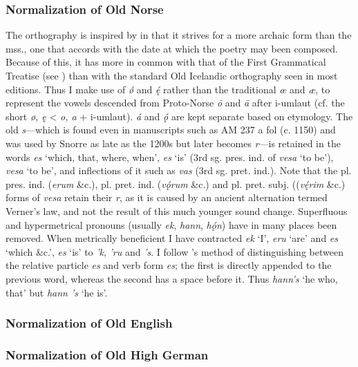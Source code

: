     \subsubsection{Normalization of Old Norse}
    The orthography is inspired by \textcite{FinnurEdda} in that it strives for a more archaic form than the mss., one that accords with the date at which the poetry may been composed. Because of this, it has more in common with that of the First Grammatical Treatise (see \parencite{FGTHaugen}) than with the standard Old Icelandic orthography seen in most editions. Thus I make use of \emph{ǿ} and \emph{ę́} rather than the traditional \emph{œ} and \emph{æ}, to represent the vowels descended from Proto-Norse \emph{ō} and \emph{ā} after i-umlaut (cf. the short \emph{ø, ę} < \emph{o, a} + i-umlaut).
    \emph{á} and \emph{ǫ́} are kept separate based on etymology.
    The old \emph{s}—which is found even in manuscripts such as AM 237 a fol (c. 1150) and was used by Snorre as late as the 1200s but later becomes \emph{r}—is retained in the words \emph{es} ‘which, that, where, when’, \emph{es} ‘is’ (3rd sg. pres. ind. of \emph{vesa} ‘to be’), \emph{vesa} ‘to be’, and inflections of it such as \emph{vas} (3rd sg. pret. ind.). Note that the pl. pres. ind. (\emph{erum} \&c.), pl. pret. ind. (\emph{vǫ́rum} \&c.) and pl. pret. subj. ((\emph{vę́rim} \&c.) forms of \emph{vesa} retain their \emph{r}, as it is caused by an ancient alternation termed Verner’s law, and not the result of this much younger sound change.
    Superfluous and hypermetrical pronouns (usually \emph{ek}, \emph{hann}, \emph{hǫ́n}) have in many places been removed.
    When metrically beneficient I have contracted \emph{ek} ‘I’, \emph{eru} ‘are’ and \emph{es} ‘which \&c.’, \emph{es} ‘is’ to \emph{’k}, \emph{’ru} and \emph{’s}. I follow \textcite{FinnurEdda}’s method of distinguishing between the relative particle \emph{es} and verb form \emph{es}; the first is directly appended to the previous word, whereas the second has a space before it. Thus \emph{hann’s} ‘he who, that’ but \emph{hann ’s} ‘he is’.

    \subsubsection{Normalization of Old English}

    \subsubsection{Normalization of Old High German}

